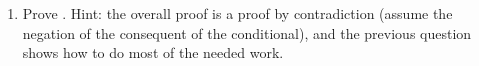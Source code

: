 \begin{enumerate}
{ \dotline

 \dotline

 \dotline

 \dotline

 \dotline

 \dotline

 \dotline

 \dotline

 \dotline

 \dotline

 \dotline

 \dotline

 \dotline

 \dotline
}
{
}
 \newpage
\item Prove . Hint: the overall proof is a proof by 
 contradiction (assume the negation of the consequent of the conditional), and 
 the previous question shows how to do most of the needed work.
\opts{
 \dotline

 \dotline

 \dotline

 \dotline

 \dotline

 \dotline

 \dotline

 \dotline

 \dotline

}
\end{enumerate}
